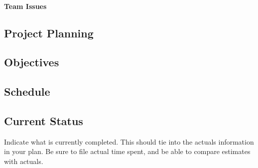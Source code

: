 \documentclass{article}
\begin{document}
\paragraph{Team Issues}

\subsection*{Project Planning}
\subsection*{Objectives}
\subsection*{Schedule}
\subsection*{Current Status}

Indicate what is currently completed. This should tie into the actuals information in your plan. Be sure to file actual time spent, and be able to compare estimates with actuals.
\end{document}
